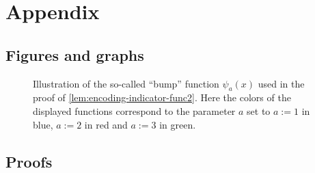 \newpage
\section*{Appendix}
\subsection*{Figures and graphs}
\begin{figure}[H]
    \centering
    
    \caption{Illustration of the so-called ``bump'' function $\psi_a(x)$ used in the proof of \cref{lem:encoding-indicator-func2}. Here the colors of the displayed functions correspond to the parameter $a$ set to $a:=1$ in blue, $a:=2$ in red and $a:=3$ in green.}
    \label{fig:bump_function}
\end{figure}

\subsection*{Proofs}

